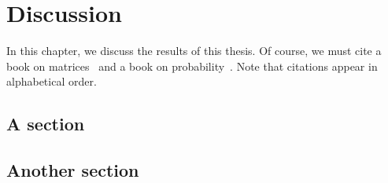 \chapter{Discussion}
In this chapter, we discuss the results of this thesis. 
Of course, we must cite a book on matrices~\cite{Horn_2012} and a book on probability~\cite{Feller}. 
Note that citations appear in alphabetical order. 

\section{A section} 
\lipsum[1-2]

\section{Another section}
\lipsum[10-14]











